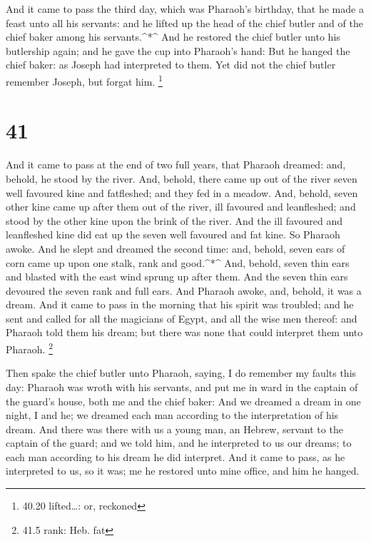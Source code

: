  And it came to pass the third day, which was Pharaoh's
birthday, that he made a feast unto all his servants: and he lifted up
the head of the chief butler and of the chief baker among his
servants.\^{}*\^{}  And he restored the chief butler unto
his butlership again; and he gave the cup into Pharaoh's hand:
 But he hanged the chief baker: as Joseph had interpreted
to them.  Yet did not the chief butler remember Joseph, but
forgat him. \footnote{40.20 lifted\ldots: or, reckoned}

\hypertarget{section-40}{%
\section{41}\label{section-40}}

 And it came to pass at the end of two full years, that
Pharaoh dreamed: and, behold, he stood by the river.  And,
behold, there came up out of the river seven well favoured kine and
fatfleshed; and they fed in a meadow.  And, behold, seven
other kine came up after them out of the river, ill favoured and
leanfleshed; and stood by the other kine upon the brink of the river.
 And the ill favoured and leanfleshed kine did eat up the
seven well favoured and fat kine. So Pharaoh awoke.  And he
slept and dreamed the second time: and, behold, seven ears of corn came
up upon one stalk, rank and good.\^{}*\^{}  And, behold,
seven thin ears and blasted with the east wind sprung up after them.
 And the seven thin ears devoured the seven rank and full
ears. And Pharaoh awoke, and, behold, it was a dream.  And
it came to pass in the morning that his spirit was troubled; and he sent
and called for all the magicians of Egypt, and all the wise men thereof:
and Pharaoh told them his dream; but there was none that could interpret
them unto Pharaoh. \footnote{41.5 rank: Heb. fat}

 Then spake the chief butler unto Pharaoh, saying, I do
remember my faults this day:  Pharaoh was wroth with his
servants, and put me in ward in the captain of the guard's house, both
me and the chief baker:  And we dreamed a dream in one
night, I and he; we dreamed each man according to the interpretation of
his dream.  And there was there with us a young man, an
Hebrew, servant to the captain of the guard; and we told him, and he
interpreted to us our dreams; to each man according to his dream he did
interpret.  And it came to pass, as he interpreted to us,
so it was; me he restored unto mine office, and him he hanged.


